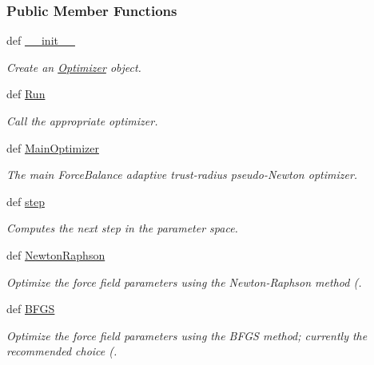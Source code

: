 \subsubsection*{\-Public \-Member \-Functions}
\begin{DoxyCompactItemize}
\item 
def \hyperlink{classforcebalance_1_1optimizer_1_1Optimizer_a674f1c17cbfaffa7955fb5d833d33e0b}{\-\_\-\-\_\-init\-\_\-\-\_\-}
\begin{DoxyCompactList}\small\item\em \-Create an \hyperlink{classforcebalance_1_1optimizer_1_1Optimizer}{\-Optimizer} object. \end{DoxyCompactList}\item 
def \hyperlink{classforcebalance_1_1optimizer_1_1Optimizer_a85688c895ce936fa4368d9e2f7fcb4b5}{\-Run}
\begin{DoxyCompactList}\small\item\em \-Call the appropriate optimizer. \end{DoxyCompactList}\item 
def \hyperlink{classforcebalance_1_1optimizer_1_1Optimizer_a1d222f82239075ea0d6b9294b2f50e12}{\-Main\-Optimizer}
\begin{DoxyCompactList}\small\item\em \-The main \-Force\-Balance adaptive trust-\/radius pseudo-\/\-Newton optimizer. \end{DoxyCompactList}\item 
def \hyperlink{classforcebalance_1_1optimizer_1_1Optimizer_aacc231ff56f5d87597a95f4e543360a2}{step}
\begin{DoxyCompactList}\small\item\em \-Computes the next step in the parameter space. \end{DoxyCompactList}\item 
def \hyperlink{classforcebalance_1_1optimizer_1_1Optimizer_a5b6e95f9f49b7d970ac8441d68a0023f}{\-Newton\-Raphson}
\begin{DoxyCompactList}\small\item\em \-Optimize the force field parameters using the \-Newton-\/\-Raphson method (. \end{DoxyCompactList}\item 
def \hyperlink{classforcebalance_1_1optimizer_1_1Optimizer_a58b957fe289822934711c29dfeb8d203}{\-B\-F\-G\-S}
\begin{DoxyCompactList}\small\item\em \-Optimize the force field parameters using the \-B\-F\-G\-S method; currently the recommended choice (. \end{DoxyCompactList}\item 

\end{DoxyCompactItemize}
